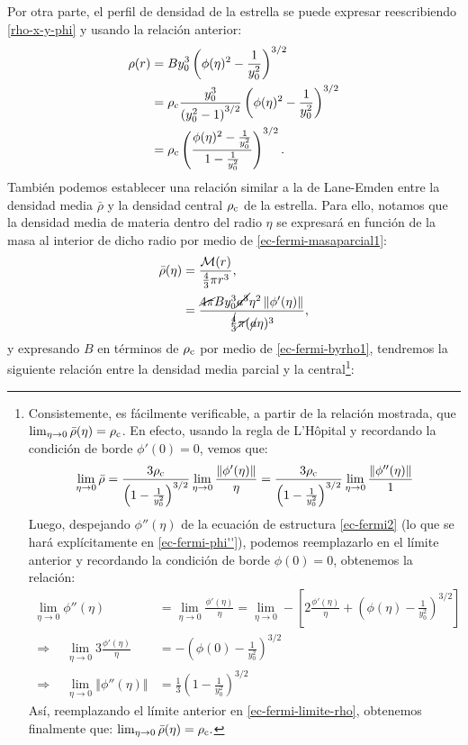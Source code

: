Por otra parte, el perfil de densidad de la estrella se puede expresar reescribiendo \eqref{rho-x-y-phi} y usando la relación anterior:
\begin{align}
 \rho(r)&=By_0^3\left(\phi(\eta)^2-\frac{1}{y_0^2}\right)^{3/2}\label{ec-fermi-dens}\\
&=\rho_{\rm c}\frac{y_0^3}{\left(y_0^2-1\right)^{3/2}}\left(\phi(\eta)^2-\frac{1}{y_0^2}\right)^{3/2}\\
&=\rho_{\rm c}\left(\frac{\phi(\eta)^2-\frac{1}{y_0^2}}{1-\frac{1}{y_0^2}}\right)^{3/2}.
\end{align}
También podemos establecer una relación similar a la de Lane-Emden entre la densidad media $\bar{\rho}$ y la densidad central $\rho_{\rm c}$ de la estrella. Para ello, notamos que la densidad media de materia dentro del radio $\eta$ se expresará en función de la masa al interior de dicho radio por medio de \eqref{ec-fermi-masaparcial1}:
\begin{align}
 \bar{\rho}(\eta)&=\frac{\mathcal{M}(r)}{\frac{4}{3}\pi r^3},\\
&=\frac{\cancel{4\pi} B y_0^3 \cancel{a^3}\eta^2\left\Vert\phi'(\eta)\right\Vert}{\frac{\cancel{4}}{3}\cancel{\pi} (\cancel{a}\eta)^3},
\end{align}
y expresando $B$ en términos de $\rho_{\rm c}$ por medio de \eqref{ec-fermi-byrho1}, tendremos la siguiente relación entre la densidad media parcial y la central\footnote{Consistemente, es fácilmente verificable, a partir de la relación mostrada, que $\lim_{\eta\to 0}\bar{\rho}(\eta)=\rho_{\rm c}$. En efecto, usando la regla de L'H\^opital y recordando la condición de borde $\phi'(0)=0$, vemos que:
\begin{align}
\lim_{\eta\to 0}\bar{\rho}=\frac{3\rho_{\rm c}}{\left(1-\frac{1}{y_0^2}\right)^{3/2}}\lim_{\eta\to 0}\frac{\left\Vert\phi'(\eta)\right\Vert}{\eta}
=
\frac{3\rho_{\rm c}}{\left(1-\frac{1}{y_0^2}\right)^{3/2}}\lim_{\eta\to 0}\frac{\left\Vert\phi''(\eta)\right\Vert}{1}\label{ec-fermi-limite-rho}
\end{align}
Luego, despejando $\phi''(\eta)$ de la ecuación de estructura \eqref{ec-fermi2} (lo que se hará explícitamente en \eqref{ec-fermi-phi''}), podemos reemplazarlo en el límite anterior y recordando la condición de borde $\phi(0)=0$, obtenemos la relación:
\begin{align}
\lim_{\eta\to 0}\phi''(\eta)&=\lim_{\eta\to 0}\frac{\phi'(\eta)}{\eta}=\lim_{\eta\to 0}-\left[2\frac{\phi'(\eta)}{\eta}+\left(\phi(\eta)-\frac{1}{y_0^2}\right)^{3/2}\right]\\
\Rightarrow\quad\lim_{\eta\to 0}3\frac{\phi'(\eta)}{\eta}&=-\left(\phi(0)-\frac{1}{y_0^2}\right)^{3/2}\\
\Rightarrow\quad\lim_{\eta\to 0}\left\Vert\phi''(\eta)\right\Vert&=\frac{1}{3}\left(1-\frac{1}{y_0^2}\right)^{3/2}
\end{align}
Así, reemplazando el límite anterior en \eqref{ec-fermi-limite-rho}, obtenemos finalmente que:
$\lim_{\eta\to 0}\bar{\rho}(\eta)=\rho_{\rm c}.$
}:
